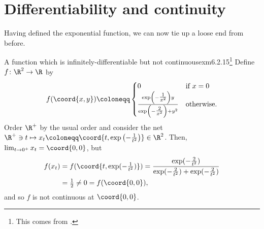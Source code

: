 \section{Differentiability and continuity}

Having defined the exponential function, we can now tie up a loose end from before.
\begin{exm}{A function which is infinitely-diff\-er\-en\-tia\-ble but not continuous}{exm6.2.15}\footnote{This comes from \cite[pg.~116]{Gelbaum}.}
Define $f\colon \R ^2\rightarrow \R$ by
\begin{equation}
f(\coord{x,y})\coloneqq \begin{cases}0 & \text{if }x=0 \\ \frac{\exp \left( -\tfrac{1}{x^2}\right) y}{\exp \left( -\tfrac{2}{x^2}\right) +y^2} & \text{otherwise.}\end{cases}
\end{equation}
Order $\R ^+$ by the usual order and consider the net $\R ^+\ni t\mapsto x_t\coloneqq \coord{t,\exp \left( -\frac{1}{t^2}\right) }\in \R ^2$.  Then, $\lim _{t\to 0^+}x_t=\coord{0,0}$, but
\begin{equation}
\begin{split}
f(x_t) & =f(\coord{t,\exp (-\tfrac{1}{t^2})})=\frac{\exp (-\tfrac{2}{t^2})}{\exp (-\tfrac{2}{t^2})+\exp (-\tfrac{2}{t^2})} \\
& =\tfrac{1}{2}\neq 0=f(\coord{0,0}),
\end{split}
\end{equation}
and so $f$ is not continuous at $\coord{0,0}$.


\end{exm}
